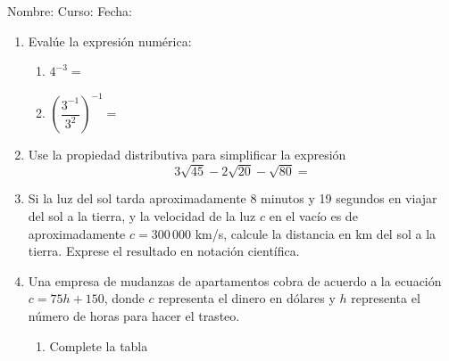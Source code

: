 \documentclass[fleqn]{article}
\newcommand{\LineaNombre}{%
\par
\vspace{\baselineskip}
Nombre:\hrulefill \; Curso: \underline{\hspace*{48pt}} \; Fecha: \underline{\hspace*{2.5cm}} \relax
\par}
\begin{document}
\LineaNombre
\begin{enumerate}
 \item Evalúe la expresión numérica:
 \begin{enumerate}
 \item \label{ej01} $4^{-3}=$\noanswer[12pt]
 \item \label{ej02} $\left(\dfrac{3^{-1}}{3^{2}}\right)^{-1}=$\noanswer[12pt]
 \end{enumerate}
 \item Use la propiedad distributiva para simplificar la expresión \[3\sqrt{45}-2\sqrt{20}-\sqrt{80}=\]\noanswer[24pt]
 \item Si la luz del sol tarda aproximadamente 8 minutos y 19 segundos en viajar del sol a la tierra, y la velocidad de la luz $c$ en el vacío es de aproximadamente $c=300\,000$ km/s, calcule la distancia en km del sol a la tierra. Exprese el resultado en notación científica.\noanswer
 \newpage
 \item \label{ej63} Una empresa de mudanzas de apartamentos cobra de acuerdo a la ecuación $c=75h+150$, donde $c$ representa el dinero en dólares y $h$ representa el número de horas para hacer el trasteo. 
\begin{enumerate}
\item Complete la tabla


\end{enumerate}
\end{enumerate}
\end{document}
